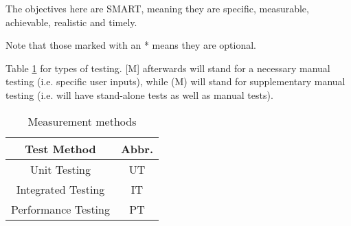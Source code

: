 The objectives here are SMART, meaning they are specific, measurable, achievable, realistic and timely.

Note that those marked with an * means they are optional.

Table \ref{tab:abbrs} for types of testing. [M] afterwards will stand for a necessary manual testing (i.e. specific user inputs), while (M) will stand for supplementary manual testing (i.e. will have stand-alone tests as well as manual tests).

\begin{table}[!ht]
    \centering
    \begin{tabular}{|c|c|}
        \hline
        Test Method         & Abbr. \\
        \hline
        Unit Testing        & UT    \\
        Integrated Testing  & IT    \\
        Performance Testing & PT    \\
        \hline
    \end{tabular}
    \caption{Measurement methods}
    \label{tab:abbrs}
\end{table}

